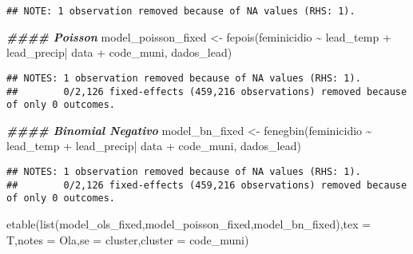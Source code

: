 \documentclass[
]{article}
\newenvironment{Shaded}{\begin{snugshade}}{\end{snugshade}}
\newcommand{\AttributeTok}[1]{\textcolor[rgb]{0.77,0.63,0.00}{#1}}
\newcommand{\DocumentationTok}[1]{\textcolor[rgb]{0.56,0.35,0.01}{\textbf{\textit{#1}}}}
\newcommand{\FunctionTok}[1]{\textcolor[rgb]{0.00,0.00,0.00}{#1}}
\newcommand{\NormalTok}[1]{#1}
\newcommand{\OtherTok}[1]{\textcolor[rgb]{0.56,0.35,0.01}{#1}}
\newcommand{\SpecialCharTok}[1]{\textcolor[rgb]{0.00,0.00,0.00}{#1}}
\newcommand{\StringTok}[1]{\textcolor[rgb]{0.31,0.60,0.02}{#1}}
\begin{document}
\begin{verbatim}
## NOTE: 1 observation removed because of NA values (RHS: 1).
\end{verbatim}

\begin{Shaded}
\begin{Highlighting}[]
\DocumentationTok{\#\#\#\# Poisson}
\NormalTok{model\_poisson\_fixed }\OtherTok{\textless{}{-}} \FunctionTok{fepois}\NormalTok{(feminicidio  }\SpecialCharTok{\textasciitilde{}}\NormalTok{ lead\_temp }\SpecialCharTok{+}\NormalTok{ lead\_precip}\SpecialCharTok{|}\NormalTok{ data }\SpecialCharTok{+}\NormalTok{ code\_muni, dados\_lead)}
\end{Highlighting}
\end{Shaded}

\begin{verbatim}
## NOTES: 1 observation removed because of NA values (RHS: 1).
##        0/2,126 fixed-effects (459,216 observations) removed because of only 0 outcomes.
\end{verbatim}

\begin{Shaded}
\begin{Highlighting}[]
\DocumentationTok{\#\#\#\# Binomial Negativo}
\NormalTok{model\_bn\_fixed }\OtherTok{\textless{}{-}} \FunctionTok{fenegbin}\NormalTok{(feminicidio  }\SpecialCharTok{\textasciitilde{}}\NormalTok{ lead\_temp }\SpecialCharTok{+}\NormalTok{ lead\_precip}\SpecialCharTok{|}\NormalTok{ data }\SpecialCharTok{+}\NormalTok{ code\_muni, dados\_lead)}
\end{Highlighting}
\end{Shaded}

\begin{verbatim}
## NOTES: 1 observation removed because of NA values (RHS: 1).
##        0/2,126 fixed-effects (459,216 observations) removed because of only 0 outcomes.
\end{verbatim}

\begin{Shaded}
\begin{Highlighting}[]
\FunctionTok{etable}\NormalTok{(}\FunctionTok{list}\NormalTok{(model\_ols\_fixed,model\_poisson\_fixed,model\_bn\_fixed),}\AttributeTok{tex =}\NormalTok{ T,}\AttributeTok{notes =} \StringTok{\textquotesingle{}Ola\textquotesingle{}}\NormalTok{,}\AttributeTok{se =} \StringTok{\textquotesingle{}cluster\textquotesingle{}}\NormalTok{,}\AttributeTok{cluster =} \StringTok{\textquotesingle{}code\_muni\textquotesingle{}}\NormalTok{)}
\end{Highlighting}
\end{Shaded}
\end{document}
